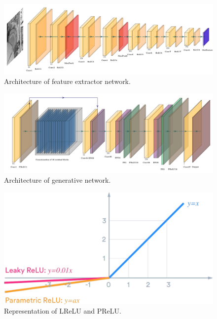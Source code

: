 \documentclass[10pt,twocolumn,letterpaper]{article}
\begin{document}
 \begin{figure}
\begin{center}
\includegraphics[width=1\textwidth]{fig3}
\end{center}
   \caption{Architecture of feature extractor network.}
\label{fig3}
\end{figure}

 \begin{figure}
\begin{center}
\includegraphics[width=1\textwidth]{fig4}
\end{center}
   \caption{Architecture of generative network.}
\label{fig4}
\end{figure}

 \begin{figure}
\begin{center}
\includegraphics[width=1\textwidth]{fig5}
\end{center}
   \caption{Representation of LReLU and PReLU.}
\label{fig5}
\end{figure}
\end{document}

